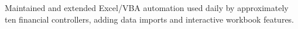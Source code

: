 Maintained and extended Excel/VBA automation used daily by approximately ten financial controllers, adding data imports and interactive workbook features.
